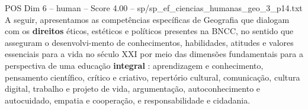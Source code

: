\begin{textsample}{POS Dim 6 – human – Score 4.00 – sp/sp\_ef\_ciencias\_humanas\_geo\_3\_p14.txt}  \label{ex:f6_pos_007}
A seguir, apresentamos as competências específicas de Geografia que dialogam com os \textbf{direitos} éticos, estéticos e políticos presentes na BNCC, no sentido que asseguram o desenvolvi-mento de conhecimentos, habilidades, atitudes e valores essenciais para a vida no século XXI por meio das dimensões fundamentais para a perspectiva de uma educação \textbf{integral} : aprendizagem e conhecimento, pensamento científico, crítico e criativo, repertório cultural, comunicação, cultura digital, trabalho e projeto de vida, argumentação, autoconhecimento e autocuidado, empatia e cooperação, e responsabilidade e cidadania.

\end{textsample}

